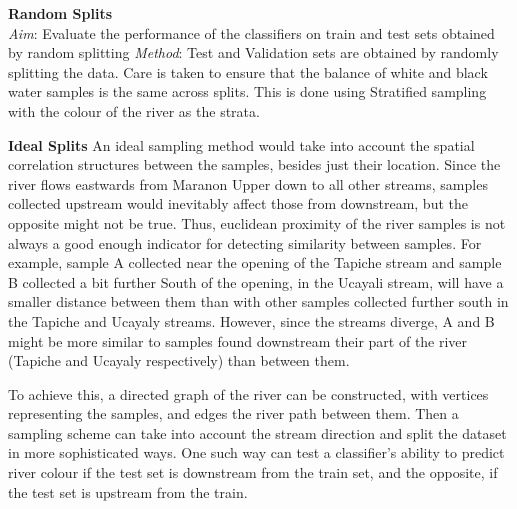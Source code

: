 \large{ \bf Random Splits}\\
\textit{Aim}: Evaluate the performance of the classifiers on train and test sets obtained by random splitting
\textit{Method}: Test and Validation sets are obtained by randomly splitting the data. Care is taken to ensure that the balance of white and black water samples is the same across splits. This is done using Stratified sampling with the colour of the river as the strata.


{ \bf Ideal Splits}
An ideal sampling method would take into account the spatial correlation structures between the samples, besides just their location. Since the river flows eastwards from Maranon Upper down to all other streams, samples collected upstream would inevitably affect those from downstream, but the opposite might not be true. Thus, euclidean proximity of the river samples is not always a good enough indicator for detecting similarity between samples. For example, sample A collected near the opening of the Tapiche stream and sample B collected a bit further South of the opening, in the Ucayali stream, will have a smaller distance between them than with other samples collected further south in the Tapiche and Ucayaly streams. However, since the streams diverge, A and B might be more similar to samples found downstream their part of the river (Tapiche and Ucayaly respectively) than between them. 

To achieve this, a directed graph of the river can be constructed, with vertices representing the samples, and edges the river path between them. Then a sampling scheme can take into account the stream direction and split the dataset in more sophisticated ways. One such way can test a classifier's ability to predict river colour if the test set is downstream from the train set, and the opposite, if the test set is upstream from the train. 


%
%
%
%
%



